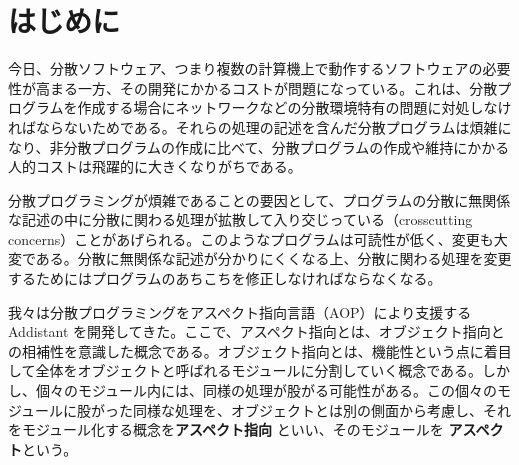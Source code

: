 \documentclass[12pt,twoside]{jbook}
\begin{document}

\tableofcontents       %

%
%

\listoffigures         %
\listoftables          %


%
%
\chapter{はじめに}

今日、分散ソフトウェア、つまり複数の計算機上で動作するソフトウェアの必要
性が高まる一方、その開発にかかるコストが問題になっている。これは、分散プ
ログラムを作成する場合にネットワークなどの分散環境特有の問題に対処しなけ
ればならないためである。それらの処理の記述を含んだ分散プログラムは煩雑に
なり、非分散プログラムの作成に比べて、分散プログラムの作成や維持にかかる
人的コストは飛躍的に大きくなりがちである。

分散プログラミングが煩雑であることの要因として、プログラムの分散に無関係
な記述の中に分散に関わる処理が拡散して入り交じっている（crosscutting
concerns）ことがあげられる。このようなプログラムは可読性が低く、変更も大
変である。分散に無関係な記述が分かりにくくなる上、分散に関わる処理を変更
するためにはプログラムのあちこちを修正しなければならなくなる。

我々は分散プログラミングをアスペクト指向言語（AOP）により支援する 
Addistant を開発してきた。ここで、アスペクト指向とは、オブジェクト指向と
の相補性を意識した概念である。オブジェクト指向とは、機能性という点に着目
して全体をオブジェクトと呼ばれるモジュールに分割していく概念である。しか
し、個々のモジュール内には、同様の処理が股がる可能性がある。この個々のモ
ジュールに股がった同様な処理を、オブジェクトとは別の側面から考慮し、それ
をモジュール化する概念を{\bf{アスペクト指向}} といい、そのモジュールを
{\bf{アスペクト}}という。
\end{document}
